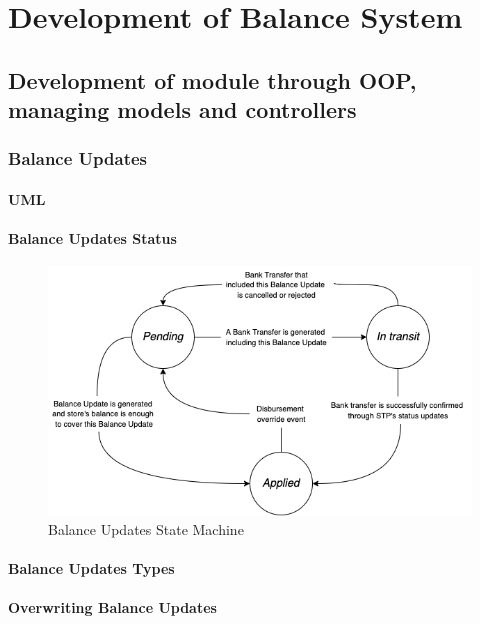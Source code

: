 \chapter{Development of Balance System}

\section{Development of module through OOP, managing models and controllers}

\subsection{Balance Updates}

\subsubsection{UML}

\subsubsection{Balance Updates Status}

\begin{figure} [h!]
    \centering
    \includegraphics[scale = 0.7]{assets/diagrams/BalanceUpdatesStateMachine.png}
    \caption{Balance Updates State Machine}\label{fig:state_machine_balance_updates}
\end{figure}

\subsubsection{Balance Updates Types}

\subsubsection{Overwriting Balance Updates}


